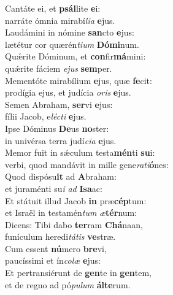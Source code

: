 \evenverse Cantáte ei, et \textbf{psál}lite \textbf{e}i:~\*\\
\evenverse narráte ómnia mirabí\textit{li}\textit{a} \textbf{e}jus.\\
\oddverse Laudámini in nómine \textbf{san}cto \textbf{e}jus:~\*\\
\oddverse lætétur cor quærén\textit{ti}\textit{um} \textbf{Dó}\textbf{mi}num.\\
\evenverse Quǽrite Dóminum, et \textbf{con}fir\textbf{má}mini:~\*\\
\evenverse quǽrite fáciem \textit{e}\textit{jus} \textbf{sem}per.\\
\oddverse Mementóte mirabílium \textbf{e}jus, quæ \textbf{fe}cit:~\*\\
\oddverse prodígia ejus, et judícia \textit{o}\textit{ris} \textbf{e}jus.\\
\evenverse Semen Abraham, \textbf{ser}vi \textbf{e}jus:~\*\\
\evenverse fílii Jacob, e\textit{lé}\textit{cti} \textbf{e}jus.\\
\oddverse Ipse Dóminus \textbf{De}us \textbf{no}ster:~\*\\
\oddverse in univérsa terra judí\textit{ci}\textit{a} \textbf{e}jus.\\
\evenverse Memor fuit in sǽculum testa\textbf{mén}ti \textbf{su}i:~\*\\
\evenverse verbi, quod mandávit in mille gene\textit{ra}\textit{ti}\textbf{ó}nes:\\
\oddverse Quod dispósu\textbf{it} ad \textbf{A}braham:~\*\\
\oddverse et juraménti su\textit{i} \textit{ad} \textbf{I}\textbf{sa}ac:\\
\evenverse Et státuit illud Jacob \textbf{in} præ\textbf{cép}tum:~\*\\
\evenverse et Israël in testamén\textit{tum} \textit{æ}\textbf{tér}num:\\
\oddverse Dicens: Tibi dabo \textbf{ter}ram \textbf{Chá}naan,~\*\\
\oddverse funículum heredi\textit{tá}\textit{tis} \textbf{ve}stræ.\\
\evenverse Cum essent \textbf{nú}mero \textbf{bre}vi,~\*\\
\evenverse paucíssimi et ín\textit{co}\textit{læ} \textbf{e}jus:\\
\oddverse Et pertransiérunt de \textbf{gen}te in \textbf{gen}tem,~\*\\
\oddverse et de regno ad pó\textit{pu}\textit{lum} \textbf{ál}\textbf{te}rum.\\
